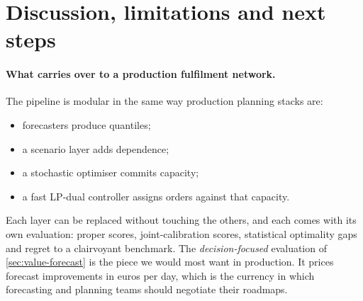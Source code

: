 \section{Discussion, limitations and next steps}\label{sec:discussion}

\paragraph{What carries over to a production fulfilment network.}
The pipeline is modular in the same way production planning stacks are:
\begin{itemize}
  \item forecasters produce quantiles;
  \item a scenario layer adds dependence;
  \item a stochastic optimiser commits capacity;
  \item a fast LP-dual controller assigns orders against that capacity.
\end{itemize}
Each layer can be replaced without touching the others, and each comes with its own evaluation: proper scores, joint-calibration scores, statistical optimality gaps and regret to a clairvoyant benchmark.
The \emph{decision-focused} evaluation of \cref{sec:value-forecast} is the piece we would most want in production.
It prices forecast improvements in euros per day, which is the currency in which forecasting and planning teams should negotiate their roadmaps.

